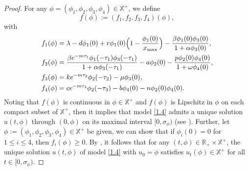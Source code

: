 \documentclass[reqno]{amsart}
\begin{document}
\begin{proof}
For any $\phi=(\phi_1,\phi_2,\phi_3,\phi_4) \in \mathbb{X}^+$, we define
$$
f(\phi):=(f_1, f_2, f_3, f_4)(\phi),
$$
with
\begin{align*}
f_1(\phi)&=  \lambda-d\phi_1(0)+r\phi_1(0)\Big(1-\frac{\phi_1(0)}{x_{\rm max}}\Big)- \frac{{\beta }\phi_1(0)\phi_3(0)}{1+\alpha\phi_3(0)},\\
f_2(\phi)&=  \frac{\beta e^{-m\tau_1}\phi_1(-\tau_{1})\phi_3(-\tau_{1})}{1+\alpha\phi_3(-\tau_{1})}-a\phi_2(0)-\frac{p\phi_2(0)\phi_4(0)}{1+\omega\phi_4(0)},\\
f_3(\phi)&=ke^{-m\tau_2}\phi_2(-\tau_{2})-\mu\phi_3(0),\\
f_4(\phi)&=ce^{-m\tau_3}\phi_2(-\tau_3)-b\phi_4(0)-n\phi_2(0)\phi_4(0).
\end{align*}
Noting that $f(\phi)$ is continuous in  $\phi\in \mathbb{X}^+$ and
$f(\phi)$ is Lipschitz in $\phi$ on each compact subset of $\mathbb{X}^+$,  
then it implies that model \eqref{1.4} admits a unique solution $u(t,\phi)$ 
through $(0,\phi)$
on its maximal interval $[0, \sigma_{\phi})$  
(see \cite[Theorem 2.2.1 and Theorem 2.2.3]{HV}). Further, let
$\phi:= (\phi_1, \phi_2, \phi_3, \phi_4)\in \mathbb{X}^+$ be given, we can show 
that if $\phi_i(0)=0$ for $1\leq i\leq 4$, then $f_i(\phi)\geq 0$.
By \cite[Theorem 5.2.1 Remark 5.2.1]{S}, it follows that for any 
$(t, \phi)\in \mathbb{R}_+\times \mathbb{X}^+$, the unique solution $u(t,\phi)$
of  model \eqref{1.4} with $u_0=\phi$  satisfies $u_t(\phi)\in \mathbb{X}^+$ for all 
$t\in [0, \sigma_{\phi})$.


\end{proof}
\end{document}
